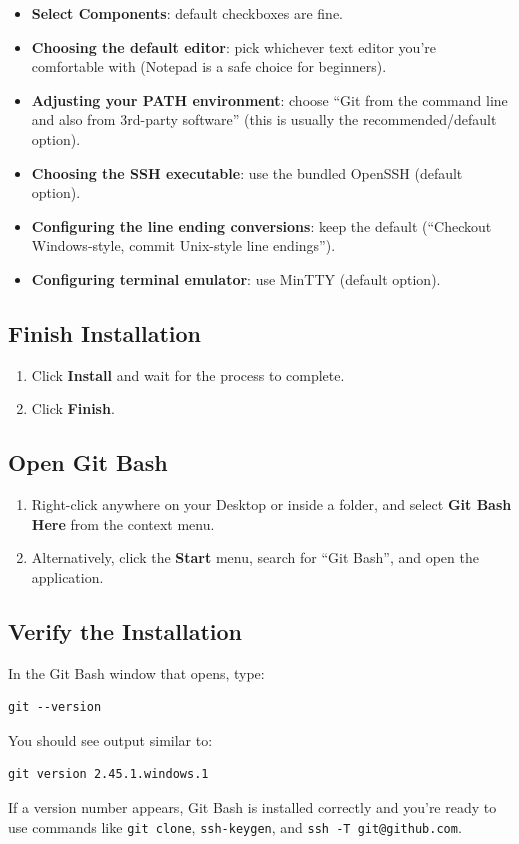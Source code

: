 \documentclass[../main.tex]{subfiles}
\begin{document}
\begin{itemize}[leftmargin=*]
    \item \textbf{Select Components}: default checkboxes are fine.
    \item \textbf{Choosing the default editor}: pick whichever text
    editor you're comfortable with (Notepad is a safe choice for
    beginners).
    \item \textbf{Adjusting your PATH environment}: choose
    ``Git from the command line and also from 3rd-party software''
    (this is usually the recommended/default option).
    \item \textbf{Choosing the SSH executable}: use the bundled
    OpenSSH (default option).
    \item \textbf{Configuring the line ending conversions}: keep the
    default (``Checkout Windows-style, commit Unix-style line
    endings'').
    \item \textbf{Configuring terminal emulator}: use MinTTY
    (default option).
\end{itemize}

\subsection{Finish Installation}
\begin{enumerate}[leftmargin=*]
    \item Click \textbf{Install} and wait for the process to complete.
    \item Click \textbf{Finish}.
\end{enumerate}

\subsection{Open Git Bash}
\begin{enumerate}[leftmargin=*]
    \item Right-click anywhere on your Desktop or inside a folder,
    and select \textbf{Git Bash Here} from the context menu.
    \item Alternatively, click the \textbf{Start} menu, search for
    ``Git Bash'', and open the application.
\end{enumerate}

\subsection{Verify the Installation}
In the Git Bash window that opens, type:

\begin{lstlisting}
git --version
\end{lstlisting}

You should see output similar to:

\begin{lstlisting}
git version 2.45.1.windows.1
\end{lstlisting}

If a version number appears, Git Bash is installed correctly and
you're ready to use commands like \texttt{git clone},
\texttt{ssh-keygen}, and \texttt{ssh -T git@github.com}.
\end{document}
